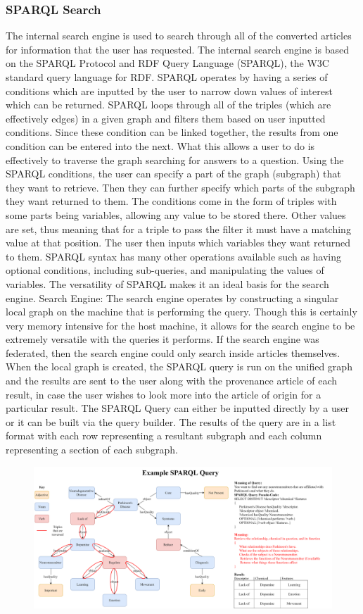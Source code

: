 \documentclass[12pt]{article}
\begin{document}
	\subsubsection{SPARQL Search}
	\quad The internal search engine is used to search through all of the converted articles for information that the user has requested. The internal search engine is based on the SPARQL Protocol and RDF Query Language (SPARQL), the W3C standard query language for RDF. SPARQL operates by having a series of conditions which are inputted by the user to narrow down values of interest which can be returned. SPARQL loops through all of the triples (which are effectively edges) in a given graph and filters them based on user inputted conditions. Since these condition can be linked together, the results from one condition can be entered into the next. What this allows a user to do is effectively to traverse the graph searching for answers to a question. Using the SPARQL conditions, the user can specify a part of the graph (subgraph) that they want to retrieve. Then they can further specify which parts of the subgraph they want returned to them. The conditions come in the form of triples with some parts being variables, allowing any value to be stored there. Other values are set, thus meaning that for a triple to pass the filter it must have a matching value at that position. The user then inputs which variables they want returned to them. SPARQL syntax has many other operations available such as having optional conditions, including sub-queries, and manipulating the values of variables. The versatility of SPARQL makes it an ideal basis for the search engine. 
	Search Engine: The search engine operates by constructing a singular local graph on the machine that is performing the query. Though this is certainly very memory intensive for the host machine, it allows for the search engine to be extremely versatile with the queries it performs. If the search engine was federated, then the search engine could only search inside articles themselves. When the local graph is created, the SPARQL query is run on the unified graph and the results are sent to the user along with the provenance article of each result, in case the user wishes to look more into the article of origin for a particular result. The SPARQL Query can either be inputted directly by a user or it can be built via the query builder. The results of the query are in a list format with each row representing a resultant subgraph and each column representing a section of each subgraph.
	\begin{figure}[h!]
		\centering
		\includegraphics[scale=0.11]{ExampleSPARQL_vJSHS2.0}
	\end{figure}
\end{document}
